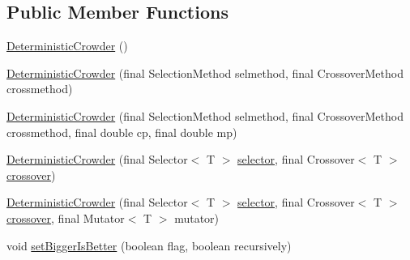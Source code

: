 \subsection*{Public Member Functions}
\begin{DoxyCompactItemize}
\item 
\hyperlink{classjenes_1_1stage_1_1operator_1_1common_1_1_deterministic_crowder_3_01_t_01extends_01_chromosome_01_4_ad52c0d6a4bc032c8c198bf05cc3acf6f}{Deterministic\-Crowder} ()
\item 
\hyperlink{classjenes_1_1stage_1_1operator_1_1common_1_1_deterministic_crowder_3_01_t_01extends_01_chromosome_01_4_ae974a4b359a9a467dfa434dd47a27cf7}{Deterministic\-Crowder} (final Selection\-Method selmethod, final Crossover\-Method crossmethod)
\item 
\hyperlink{classjenes_1_1stage_1_1operator_1_1common_1_1_deterministic_crowder_3_01_t_01extends_01_chromosome_01_4_aa59e2a1dcdb2cd6cc7a70e344a77dd31}{Deterministic\-Crowder} (final Selection\-Method selmethod, final Crossover\-Method crossmethod, final double cp, final double mp)
\item 
\hyperlink{classjenes_1_1stage_1_1operator_1_1common_1_1_deterministic_crowder_3_01_t_01extends_01_chromosome_01_4_ad7eed64a7fe60239ba3289ebf6003e8c}{Deterministic\-Crowder} (final Selector$<$ T $>$ \hyperlink{classjenes_1_1stage_1_1operator_1_1common_1_1_deterministic_crowder_3_01_t_01extends_01_chromosome_01_4_a741955421216546663d52fd901c75649}{selector}, final Crossover$<$ T $>$ \hyperlink{classjenes_1_1stage_1_1operator_1_1common_1_1_deterministic_crowder_3_01_t_01extends_01_chromosome_01_4_a992be483e017714e73cfb444385b637c}{crossover})
\item 
\hyperlink{classjenes_1_1stage_1_1operator_1_1common_1_1_deterministic_crowder_3_01_t_01extends_01_chromosome_01_4_a6359043178a5e4d8922485528acbbcec}{Deterministic\-Crowder} (final Selector$<$ T $>$ \hyperlink{classjenes_1_1stage_1_1operator_1_1common_1_1_deterministic_crowder_3_01_t_01extends_01_chromosome_01_4_a741955421216546663d52fd901c75649}{selector}, final Crossover$<$ T $>$ \hyperlink{classjenes_1_1stage_1_1operator_1_1common_1_1_deterministic_crowder_3_01_t_01extends_01_chromosome_01_4_a992be483e017714e73cfb444385b637c}{crossover}, final Mutator$<$ T $>$ mutator)
\item 
void \hyperlink{classjenes_1_1stage_1_1operator_1_1common_1_1_deterministic_crowder_3_01_t_01extends_01_chromosome_01_4_af7b258f528b701713808c16bca29ca66}{set\-Bigger\-Is\-Better} (boolean flag, boolean recursively)
\end{DoxyCompactItemize}
